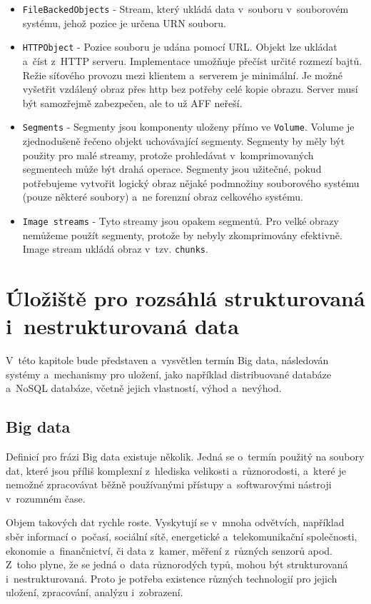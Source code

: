 \begin{itemize}
\item \texttt{FileBackedObjects} - Stream, který ukládá data v~souboru v~souborovém systému, jehož pozice je určena URN souboru.

\item \texttt{HTTPObject} - Pozice souboru je udána pomocí URL. Objekt lze ukládat a~číst z~HTTP serveru. Implementace umožňuje přečíst určité rozmezí bajtů. Režie síťového provozu mezi klientem a~serverem je minimální. Je možné vyšetřit vzdálený obraz přes http bez potřeby celé kopie obrazu. Server musí být samozřejmě zabezpečen, ale to už AFF neřeší.

\item \texttt{Segments} - Segmenty jsou komponenty uloženy přímo ve \texttt{Volume}. Volume je zjednodušeně řečeno objekt uchovávající segmenty. Segmenty by měly být použity pro malé streamy, protože prohledávat v~komprimovaných segmentech může být drahá operace. Segmenty jsou užitečné, pokud potřebujeme vytvořit logický obraz nějaké podmnožiny souborového systému (pouze některé soubory) a~ne forenzní obraz celkového systému.

\item \texttt{Image streams} - Tyto streamy jsou opakem segmentů. Pro velké obrazy nemůžeme použít segmenty, protože by nebyly zkomprimovány efektivně. Image stream ukládá obraz v~tzv. \texttt{chunks}.
\end{itemize}

\chapter{Úložiště pro rozsáhlá strukturovaná i~nestrukturovaná data} \label{chapter2}
V~této kapitole bude představen a~vysvětlen termín Big data, následován systémy a~mechanismy pro uložení, jako například distribuované databáze a~NoSQL databáze, včetně jejich vlastností, výhod a~nevýhod.

\section{Big data} \label{bigDataSection}
Definicí pro frázi Big data existuje několik. Jedná se o~termín použitý na soubory dat, které jsou příliš komplexní z~hlediska velikosti a~různorodosti, a~které je nemožné zpracovávat běžně používanými přístupy a~softwarovými nástroji v~rozumném čase.

Objem takových dat rychle roste. Vyskytují se v~mnoha odvětvích, například sběr informací o~počasí, sociální sítě, energetické a~telekomunikační společnosti, ekonomie a~finančnictví, či data z~kamer, měření z~různých senzorů apod. Z~toho plyne, že se jedná o~data různorodých typů, mohou být strukturovaná i~nestrukturovaná. Proto je potřeba existence různých technologií pro jejich uložení, zpracování, analýzu i~zobrazení.

